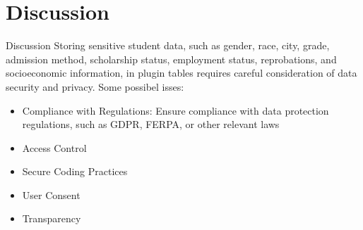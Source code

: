 \section{Discussion}

\begin{frame}{Discussion}
    Storing sensitive student data, such as gender, race, city, grade, admission method, 
    scholarship status, employment status, reprobations, and socioeconomic information, 
    in plugin tables requires careful consideration of data security and privacy. 
    Some possibel isses:
    \begin{itemize}[<+-|alert@+>]\color{gray}
        \item Compliance with Regulations: Ensure compliance with data protection regulations, such as GDPR, FERPA, or other relevant laws
        \item Access Control
        \item Secure Coding Practices
        \item User Consent
        \item Transparency
    \end{itemize}
    
\end{frame}